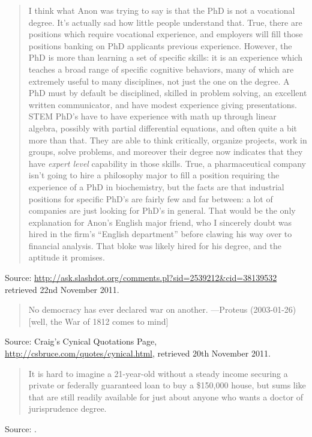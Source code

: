 \documentclass[a4paper]{article}
\begin{document}
\begin{quote}
	I think what Anon was trying to say is that the PhD is not a vocational degree. It's actually
sad how little people understand that. True, there are positions which require vocational
experience, and employers will fill those positions banking on PhD applicants previous experience.
However, the PhD is more than learning a set of specific skills: it is an experience which teaches
a broad range of specific cognitive behaviors, many of which are extremely useful to many
disciplines, not just the one on the degree. A PhD must by default be disciplined, skilled in
problem solving, an excellent written communicator, and have modest experience giving
presentations. STEM PhD's have to have experience with math up through linear algebra, possibly
with partial differential equations, and often quite a bit more than that. They are able to think
critically, organize projects, work in groups, solve problems, and moreover their degree now
indicates that they have \emph{expert level} capability in those skills. True, a pharmaceutical
company
isn't going to hire a philosophy major to fill a position requiring the experience of a PhD in
biochemistry, but the facts are that industrial positions for specific PhD's are fairly few and far
between: a lot of companies are just looking for PhD's in general. That would be the only
explanation for Anon's English major friend, who I sincerely doubt was hired in the firm's ``English
department'' before clawing his way over to financial analysis. That bloke was likely hired for his
degree, and the aptitude it promises.
\end{quote}
Source: \url{http://ask.slashdot.org/comments.pl?sid=2539212&cid=38139532} retrieved 22nd November
2011.
\medskip

\begin{quote}
	No democracy has ever declared war on another.
---Proteus (2003-01-26) [well, the War of 1812 comes to mind]
\end{quote}
Source: Craig's Cynical Quotations Page, \url{http://csbruce.com/quotes/cynical.html}, retrieved
20th November 2011.
\medskip

\begin{quote}
	It is hard to imagine a 21-year-old without a steady income securing a private or federally
guaranteed loan to buy a \$150,000 house, but sums like that are still readily available for just
about anyone who wants a doctor of jurisprudence degree.
\end{quote}
Source: \citet{Segal2011}.
\medskip
\end{document}
